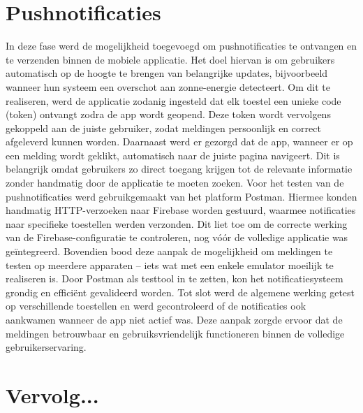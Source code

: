 \section{Pushnotificaties}

In deze fase werd de mogelijkheid toegevoegd om pushnotificaties te ontvangen en te verzenden binnen de mobiele applicatie. Het doel hiervan is om gebruikers automatisch op de hoogte te brengen van belangrijke updates, bijvoorbeeld wanneer hun systeem een overschot aan zonne-energie detecteert. Om dit te realiseren, werd de applicatie zodanig ingesteld dat elk toestel een unieke code (token) ontvangt zodra de app wordt geopend. Deze token wordt vervolgens gekoppeld aan de juiste gebruiker, zodat meldingen persoonlijk en correct afgeleverd kunnen worden.
Daarnaast werd er gezorgd dat de app, wanneer er op een melding wordt geklikt, automatisch naar de juiste pagina navigeert. Dit is belangrijk omdat gebruikers zo direct toegang krijgen tot de relevante informatie zonder handmatig door de applicatie te moeten zoeken.
Voor het testen van de pushnotificaties werd gebruikgemaakt van het platform Postman. Hiermee konden handmatig HTTP-verzoeken naar Firebase worden gestuurd, waarmee notificaties naar specifieke toestellen werden verzonden. Dit liet toe om de correcte werking van de Firebase-configuratie te controleren, nog vóór de volledige applicatie was geïntegreerd. Bovendien bood deze aanpak de mogelijkheid om meldingen te testen op meerdere apparaten – iets wat met een enkele emulator moeilijk te realiseren is. Door Postman als testtool in te zetten, kon het notificatiesysteem grondig en efficiënt gevalideerd worden.
Tot slot werd de algemene werking getest op verschillende toestellen en werd gecontroleerd of de notificaties ook aankwamen wanneer de app niet actief was. Deze aanpak zorgde ervoor dat de meldingen betrouwbaar en gebruiksvriendelijk functioneren binnen de volledige gebruikerservaring.


\section{Vervolg...}







